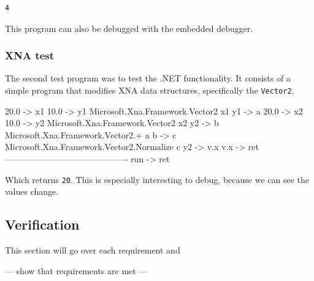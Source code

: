 \begin{lstlisting}
4
\end{lstlisting}

This program can also be debugged with the embedded debugger.

\subsubsection{XNA test}
The second test program was to test the .NET functionality.
It consists of a simple program that modifies XNA data structures, specifically the \verb|Vector2|.

\begin{MC}
20.0 -> x1
10.0 -> y1
Microsoft.Xna.Framework.Vector2 x1 y1 -> a
20.0 -> x2
10.0 -> y2
Microsoft.Xna.Framework.Vector2 x2 y2 -> b
Microsoft.Xna.Framework.Vector2.+ a b -> c
Microsoft.Xna.Framework.Vector2.Normalize c
y2 -> v.x 
v.x -> ret
-------------------------------------------
run -> ret
\end{MC}

Which returns \verb|20|.
This is especially interesting to debug, because we can see the values change.


\subsection{Verification}
This section will go over each requirement and 

--- show that requirements are met ---

